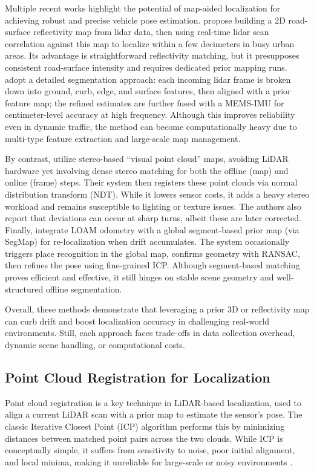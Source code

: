 Multiple recent works highlight the potential of map-aided localization for achieving robust and precise vehicle pose estimation.\cite{Levinson2007MapBased} propose building a 2D road-surface reflectivity map from lidar data, then using real-time lidar scan correlation against this map to localize within a few decimeters in busy urban areas. Its advantage is straightforward reflectivity matching, but it presupposes consistent road-surface intensity and requires dedicated prior mapping runs.\cite{liu2019segmentation} adopt a detailed segmentation approach: each incoming lidar frame is broken down into ground, curb, edge, and surface features, then aligned with a prior feature map; the refined estimates are further fused with a MEMS-IMU for centimeter-level accuracy at high frequency. Although this improves reliability even in dynamic traffic, the method can become computationally heavy due to multi-type feature extraction and large-scale map management.

By contrast,\cite{Lin2021Autonomous} utilize stereo-based “visual point cloud” maps, avoiding LiDAR hardware yet involving dense stereo matching for both the offline (map) and online (frame) steps. Their system then registers these point clouds via normal distribution transform (NDT). While it lowers sensor costs, it adds a heavy stereo workload and remains susceptible to lighting or texture issues. The authors also report that deviations can occur at sharp turns, albeit these are later corrected. Finally, \cite{Rozenberszki2020LOL} integrate LOAM odometry with a global segment-based prior map (via SegMap) for re-localization when drift accumulates. The system occasionally triggers place recognition in the global map, confirms geometry with RANSAC, then refines the pose using fine-grained ICP. Although segment-based matching proves efficient and effective, it still hinges on stable scene geometry and well-structured offline segmentation.

Overall, these methods demonstrate that leveraging a prior 3D or reflectivity map can curb drift and boost localization accuracy in challenging real-world environments. Still, each approach faces trade-offs in data collection overhead, dynamic scene handling, or computational costs.

\subsection{Point Cloud Registration for Localization}
Point cloud registration is a key technique in LiDAR-based localization, used to align a current LiDAR scan with a prior map to estimate the sensor’s pose. The classic Iterative Closest Point (ICP) algorithm performs this by minimizing distances between matched point pairs across the two clouds. While ICP is conceptually simple, it suffers from sensitivity to noise, poor initial alignment, and local minima, making it unreliable for large-scale or noisy environments \cite{BeslICP1992}.

